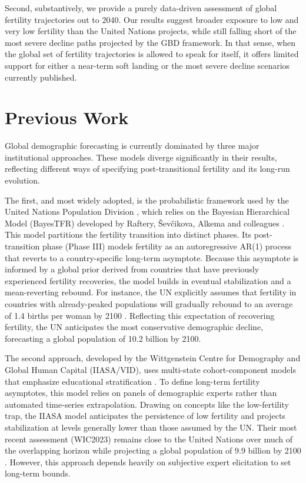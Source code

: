 \documentclass[12pt]{article}
\begin{document}
Second, substantively, we provide a purely data-driven assessment of global fertility trajectories out to 2040. Our results suggest broader exposure to low and very low fertility than the United Nations projects, while still falling short of the most severe decline paths projected by the GBD framework. In that sense, when the global set of fertility trajectories is allowed to speak for itself, it offers limited support for either a near-term soft landing or the most severe decline scenarios currently published.

\section{Previous Work}

Global demographic forecasting is currently dominated by three major institutional approaches. These models diverge significantly in their results, reflecting different ways of specifying post-transitional fertility and its long-run evolution.

The first, and most widely adopted, is the probabilistic framework used by the United Nations Population Division \citep{un2024wpp}, which relies on the Bayesian Hierarchical Model (BayesTFR) developed by Raftery, \v{S}ev\v{c}ikova, Alkema and colleagues \citep{alkema2011probabilistic,raftery2014bayesian, raftery2023probabilistic}. This model partitions the fertility transition into distinct phases. Its post-transition phase (Phase III) models fertility as an autoregressive AR(1) process that reverts to a country-specific long-term asymptote. Because this asymptote is informed by a global prior derived from countries that have previously experienced fertility recoveries, the model builds in eventual stabilization and a mean-reverting rebound. For instance, the UN explicitly assumes that fertility in countries with already-peaked populations will gradually rebound to an average of 1.4 births per woman by 2100 \citep{un2024wpp}. Reflecting this expectation of recovering fertility, the UN anticipates the most conservative demographic decline, forecasting a global population of 10.2 billion by 2100.

The second approach, developed by the Wittgenstein Centre for Demography and Global Human Capital (IIASA/VID), uses multi-state cohort-component models that emphasize educational stratification \citep{lutz2014world, lutz2018demographic,kc2024updating}. To define long-term fertility asymptotes, this model relies on panels of demographic experts rather than automated time-series extrapolation. Drawing on concepts like the low-fertility trap, the IIASA model anticipates the persistence of low fertility and projects stabilization at levels generally lower than those assumed by the UN. Their most recent assessment (WIC2023) remains close to the United Nations over much of the overlapping horizon while projecting a global population of 9.9 billion by 2100 \citep{kc2024updating}. However, this approach depends heavily on subjective expert elicitation to set long-term bounds.
\end{document}

